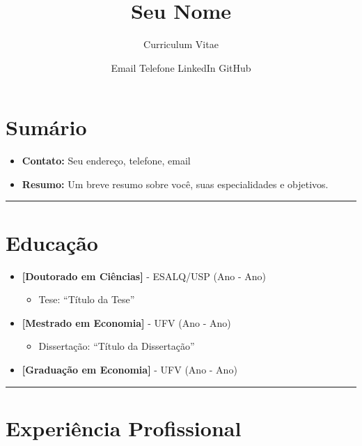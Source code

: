 \documentclass[
  12pt,
  a4paper,
]{article}
\title{Seu Nome}
\subtitle{Curriculum Vitae}
\author{Email \textbar{} Telefone \textbar{} LinkedIn \textbar{} GitHub}
\date{}
\providecommand{\tightlist}{%
  \setlength{\itemsep}{0pt}\setlength{\parskip}{0pt}}\usepackage{longtable,booktabs,array}
\renewcommand*\contentsname{Table of contents}
\newcommand\contentsname{Table of contents}
\begin{document}
\maketitle

\renewcommand*\contentsname{Table of contents}
{
\hypersetup{linkcolor=}
\setcounter{tocdepth}{3}
\tableofcontents
}

\section{Sumário}\label{sumuxe1rio}

\begin{itemize}
\tightlist
\item
  \textbf{Contato:} Seu endereço, telefone, email
\item
  \textbf{Resumo:} Um breve resumo sobre você, suas especialidades e
  objetivos.
\end{itemize}

\begin{center}\rule{0.5\linewidth}{0.5pt}\end{center}

\section{Educação}\label{educauxe7uxe3o}

\begin{itemize}
\tightlist
\item
  \textbf{{[}Doutorado em Ciências{]}} - ESALQ/USP (Ano - Ano)

  \begin{itemize}
  \tightlist
  \item
    Tese: ``Título da Tese''
  \end{itemize}
\item
  \textbf{{[}Mestrado em Economia{]}} - UFV (Ano - Ano)

  \begin{itemize}
  \tightlist
  \item
    Dissertação: ``Título da Dissertação''
  \end{itemize}
\item
  \textbf{{[}Graduação em Economia{]}} - UFV (Ano - Ano)
\end{itemize}

\begin{center}\rule{0.5\linewidth}{0.5pt}\end{center}

\section{Experiência Profissional}\label{experiuxeancia-profissional}
\end{document}
